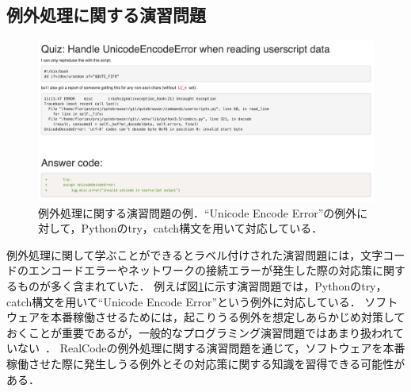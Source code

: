 \subsection{例外処理に関する演習問題}


\begin{figure}[t]
  \centering
  \includegraphics[width=1.0\columnwidth]{20190107-lab-study-exception-exercise2.png}
  \caption{例外処理に関する演習問題の例．``Unicode Encode Error''の例外に対して，Pythonのtry，catch構文を用いて対応している．}
  \label{fig:lab-study-eg-exception}
\end{figure}


例外処理に関して学ぶことができるとラベル付けされた演習問題には，文字コードのエンコードエラーやネットワークの接続エラーが発生した際の対応策に関するものが多く含まれていた．
例えば図\ref{fig:lab-study-eg-exception}に示す演習問題では，Pythonのtry，catch構文を用いて``Unicode Encode Error''という例外に対応している．
ソフトウェアを本番稼働させるためには，起こりうる例外を想定しあらかじめ対策しておくことが重要であるが，一般的なプログラミング演習問題ではあまり扱われていない~\cite{Piteira_Learning_Computer_Programming}．
RealCodeの例外処理に関する演習問題を通じて，ソフトウェアを本番稼働させた際に発生しうる例外とその対応策に関する知識を習得できる可能性がある．


